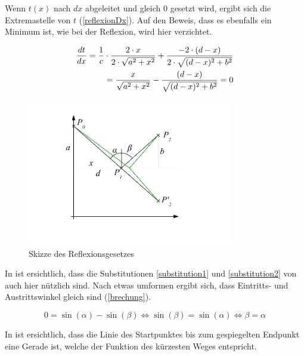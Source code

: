 Wenn $t(x)$ nach $dx$ abgeleitet und gleich 0 gesetzt wird, ergibt sich die Extremastelle  von $t$ (\eqref{reflexionDx}). Auf den Beweis, dass es ebenfalls ein Minimum ist, wie bei der Reflexion, wird hier verzichtet.

\begin{align}
\frac{dt}{dx} = \frac{1}{c} \cdot \frac{2 \cdot x}{2 \cdot \sqrt{a^2 + x^2}} + \frac{-2 \cdot (d-x)}{2 \cdot \sqrt{(d-x)^2 + b^2}} \notag \\
= \frac{x}{ \sqrt{a^2 + x^2}} - \frac{(d-x)}{ \sqrt{(d-x)^2 + b^2}} = 0 \label{reflexionDx}
\end{align}

\begin{figure}[H]
	\includegraphics[width=0.8\textwidth]{./picture/Spiegelung.pdf}
	\caption{Skizze des Reflexionsgesetzes}
	\label{Ab:spiegelung}
\end{figure}

In  ist ersichtlich, dass die Substitutionen \ref{substitution1} und \ref{substitution2} von  auch hier nützlich sind.
Nach etwas umformen ergibt sich, dass Eintritts- und Austrittswinkel gleich sind (\eqref{brechung}).


\begin{equation}
0 = \sin(\alpha) - \sin(\beta) \Leftrightarrow \sin(\beta) = \sin(\alpha) \Leftrightarrow\beta = \alpha
\label{brechung}
\end{equation}

In  ist ersichtlich, dass die Linie des Startpunktes bis zum 
gespiegelten Endpunkt eine Gerade ist, welche der Funktion des kürzesten Weges entspricht.
